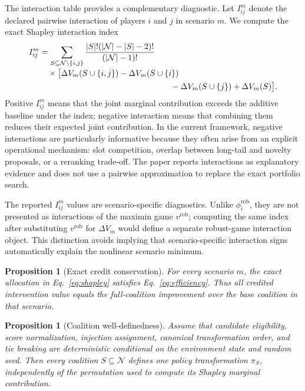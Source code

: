 \documentclass[review]{elsarticle}
\theoremstyle{plain}
\newtheorem{proposition}[theorem]{Proposition}
\theoremstyle{definition}
\theoremstyle{remark}
\newcommand{\Players}{\mathcal{N}}
\newcommand{\Policy}{\pi}
\newcommand{\Utility}{V}
\begin{document}
The interaction table provides a complementary diagnostic. Let $I_{ij}^m$ denote the declared pairwise interaction of players $i$ and $j$ in scenario $m$. We compute the exact Shapley interaction index
\begin{equation}
 \begin{aligned}
 I_{ij}^m
 &=\sum_{S\subseteq\Players\setminus\{i,j\}}
 \frac{|S|!(|\Players|-|S|-2)!}{(|\Players|-1)!}\\[-2pt]
 &\quad\times\bigl[\Delta\Utility_m(S\cup\{i,j\})-\Delta\Utility_m(S\cup\{i\})\\
 &\hspace{56mm}-\Delta\Utility_m(S\cup\{j\})+\Delta\Utility_m(S)\bigr].
 \end{aligned}
\label{eq:interaction}
\end{equation}
Positive $I_{ij}^m$ means that the joint marginal contribution exceeds the additive baseline under the index; negative interaction means that combining them reduces their expected joint contribution. In the current framework, negative interactions are particularly informative because they often arise from an explicit operational mechanism: slot competition, overlap between long-tail and novelty proposals, or a reranking trade-off. The paper reports interactions as explanatory evidence and does not use a pairwise approximation to replace the exact portfolio search.

The reported $I_{ij}^m$ values are scenario-specific diagnostics. Unlike $\phi_i^{\mathrm{rob}}$, they are not presented as interactions of the maximin game $v^{\mathrm{rob}}$; computing the same index after substituting $v^{\mathrm{rob}}$ for $\Delta\Utility_m$ would define a separate robust-game interaction object. This distinction avoids implying that scenario-specific interaction signs automatically explain the nonlinear scenario minimum.

\begin{proposition}[Exact credit conservation]\label{prop:efficiency}
For every scenario $m$, the exact allocation in Eq.~\eqref{eq:shapley} satisfies Eq.~\eqref{eq:efficiency}. Thus all credited intervention value equals the full-coalition improvement over the base coalition in that scenario.
\end{proposition}

\begin{proposition}[Coalition well-definedness]\label{prop:well-defined}
Assume that candidate eligibility, score normalization, injection assignment, canonical transformation order, and tie breaking are deterministic conditional on the environment state and random seed. Then every coalition $S\subseteq\Players$ defines one policy transformation $\Policy_S$, independently of the permutation used to compute its Shapley marginal contribution.
\end{proposition}
\end{document}
